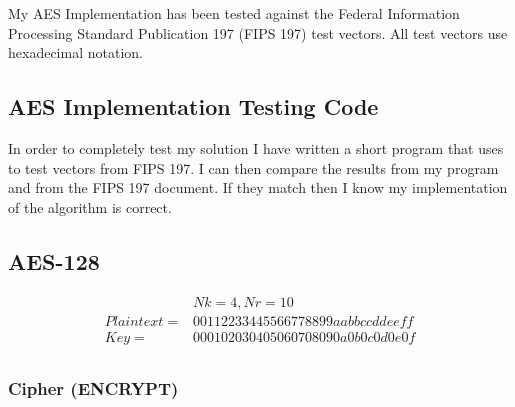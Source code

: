 My AES Implementation has been tested against the Federal Information Processing Standard Publication 197 (FIPS 197) test vectors. All test vectors use hexadecimal notation.

\subsection{AES Implementation Testing Code}

In order to completely test my solution I have written a short program that uses to test vectors from FIPS 197. I can then compare the results from my program and from the FIPS 197 document. If they match then I know my implementation of the algorithm is correct.



\subsection{AES-128}

\begin{align*}
&Nk=4, Nr=10 \\
Plaintext = &00112233445566778899aabbccddeeff \\
Key = &000102030405060708090a0b0c0d0e0f \\
\end{align*}

\subsubsection{Cipher (ENCRYPT)}

